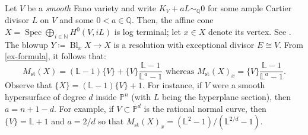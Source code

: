 \documentclass[12pt]{amsart}
\theoremstyle{plain}   %
\theoremstyle{definition}    %
\theoremstyle{remark}    %
\numberwithin{equation}{theorem}
\DeclareMathOperator{\Bl}{{Bl}}
\DeclareMathOperator{\st}{\mathrm{st}}
\DeclareMathOperator{\Spec}{{Spec}}
\newcommand{\bL}{\mathbb{L}}
\newcommand{\bN}{\mathbb{N}}
\newcommand{\bP}{\mathbb{P}}
\newcommand{\bQ}{\mathbb{Q}}
\begin{document}
\begin{example}[Cones] \label{ex.ConesOverFanos}
Let $V$ be a \emph{smooth} Fano variety and write $K_V + aL \sim_{\bQ} 0$ for some ample Cartier divisor $L$ on $V$ and some $0<a \in \bQ$. Then, the affine cone $X=\Spec \bigoplus_{i \in \bN} H^0(V,iL)$ is log terminal; let $x \in X$ denote its vertex. See \cite[Lemma 3.1]{KollarSingulaitieofMMP}. The blowup $Y \coloneqq\Bl_x X \to X$ is a resolution with exceptional divisor $E \cong V$. 
From \eqref{ex-formula}, it follows that:
\[
M_{\st}(X)= (\bL-1)\{V\} + \{V\} \frac{\bL-1}{\bL^a-1} \text{ whereas } M_{\st}(X)_x = \{V\} \frac{\bL-1}{\bL^a-1}.
\]
Observe that $\{X\}=(\bL-1)\{V\}+1$. For instance, if $V$ were a smooth hypersurface of degree $d$ inside $\bP^n$ (with $L$ being the hyperplane section), then $a= n+1-d$. For example, if $V \subset \bP^d$ is the rational normal curve, then $\{V\}=\bL+1$ and $a=2/d$ so that $M_{\st}(X)_x=(\bL^2-1)/(\bL^{2/d}-1)$.


\end{example}
\end{document}
